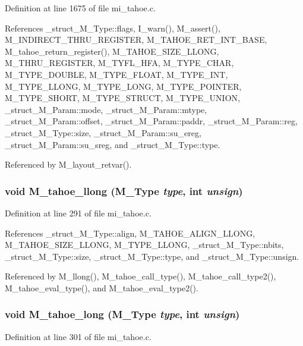 Definition at line 1675 of file mi\_\-tahoe.c.

References \_\-struct\_\-M\_\-Type::flags, I\_\-warn(), M\_\-assert(), M\_\-INDIRECT\_\-THRU\_\-REGISTER, M\_\-TAHOE\_\-RET\_\-INT\_\-BASE, M\_\-tahoe\_\-return\_\-register(), M\_\-TAHOE\_\-SIZE\_\-LLONG, M\_\-THRU\_\-REGISTER, M\_\-TYFL\_\-HFA, M\_\-TYPE\_\-CHAR, M\_\-TYPE\_\-DOUBLE, M\_\-TYPE\_\-FLOAT, M\_\-TYPE\_\-INT, M\_\-TYPE\_\-LLONG, M\_\-TYPE\_\-LONG, M\_\-TYPE\_\-POINTER, M\_\-TYPE\_\-SHORT, M\_\-TYPE\_\-STRUCT, M\_\-TYPE\_\-UNION, \_\-struct\_\-M\_\-Param::mode, \_\-struct\_\-M\_\-Param::mtype, \_\-struct\_\-M\_\-Param::offset, \_\-struct\_\-M\_\-Param::paddr, \_\-struct\_\-M\_\-Param::reg, \_\-struct\_\-M\_\-Type::size, \_\-struct\_\-M\_\-Param::su\_\-ereg, \_\-struct\_\-M\_\-Param::su\_\-sreg, and \_\-struct\_\-M\_\-Type::type.

Referenced by M\_\-layout\_\-retvar().
\subsubsection{\setlength{\rightskip}{0pt plus 5cm}void M\_\-tahoe\_\-llong (\bf{M\_\-Type} {\em type}, int {\em unsign})}\label{mi__tahoe_8c_8aabb6b608632e9da867309ea377ed47}




Definition at line 291 of file mi\_\-tahoe.c.

References \_\-struct\_\-M\_\-Type::align, M\_\-TAHOE\_\-ALIGN\_\-LLONG, M\_\-TAHOE\_\-SIZE\_\-LLONG, M\_\-TYPE\_\-LLONG, \_\-struct\_\-M\_\-Type::nbits, \_\-struct\_\-M\_\-Type::size, \_\-struct\_\-M\_\-Type::type, and \_\-struct\_\-M\_\-Type::unsign.

Referenced by M\_\-llong(), M\_\-tahoe\_\-call\_\-type(), M\_\-tahoe\_\-call\_\-type2(), M\_\-tahoe\_\-eval\_\-type(), and M\_\-tahoe\_\-eval\_\-type2().
\subsubsection{\setlength{\rightskip}{0pt plus 5cm}void M\_\-tahoe\_\-long (\bf{M\_\-Type} {\em type}, int {\em unsign})}\label{mi__tahoe_8c_9c39825c0aa53b5debe3f2351ba74e15}




Definition at line 301 of file mi\_\-tahoe.c.

